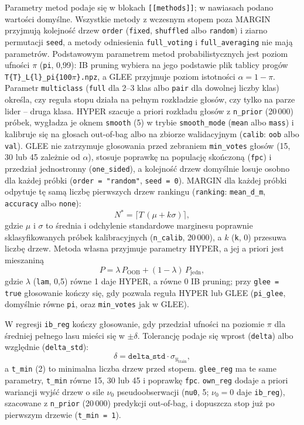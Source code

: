 \documentclass{article}
\newcommand{\code}[1]{\texttt{#1}}
\begin{document}
Parametry metod podaje się w blokach \code{[[methods]]}; w nawiasach podano wartości
domyślne. Wszystkie metody z wczesnym stopem poza MARGIN przyjmują kolejność drzew
\code{order} (\code{fixed}, \code{shuffled} albo \code{random}) i ziarno permutacji
\code{seed}, a metody odniesienia \code{full\_voting} i \code{full\_averaging} nie mają
parametrów. Podstawowym parametrem metod probabilistycznych jest poziom ufności $\pi$
(\code{pi}, 0,99): IB pruning wybiera na jego podstawie plik tablicy progów
\code{T\{T\}\_L\{l\}\_pi\{100$\pi$\}.npz}, a GLEE przyjmuje poziom istotności
$\alpha = 1 - \pi$. Parametr \code{multiclass} (\code{full} dla 2--3 klas albo \code{pair}
dla dowolnej liczby klas) określa, czy reguła stopu działa na pełnym rozkładzie głosów,
czy tylko na parze lider -- druga klasa. HYPER szacuje a priori rozkładu głosów z
\code{n\_prior} (20\,000) próbek, wygładza je oknem \code{smooth} (5) w trybie
\code{smooth\_mode} (\code{mean} albo \code{mass}) i kalibruje się na głosach out-of-bag
albo na zbiorze walidacyjnym (\code{calib}: \code{oob} albo \code{val}). GLEE nie
zatrzymuje głosowania przed zebraniem \code{min\_votes} głosów (15, 30 lub 45 zależnie od
$\alpha$), stosuje poprawkę na populację skończoną (\code{fpc}) i przedział jednostronny
(\code{one\_sided}), a kolejność drzew domyślnie losuje osobno dla każdej próbki
(\code{order = "random"}, \code{seed = 0}). MARGIN dla każdej próbki odpytuje tę samą
liczbę pierwszych drzew rankingu (\code{ranking}: \code{mean\_d\_m}, \code{accuracy} albo
\code{none}):
\[
  N^* = \bigl\lceil T\,(\mu + k\sigma) \bigr\rceil ,
\]
gdzie $\mu$ i $\sigma$ to średnia i odchylenie standardowe marginesu poprawnie
sklasyfikowanych próbek kalibracyjnych (\code{n\_calib}, 20\,000), a $k$ (\code{k}, 0)
przesuwa liczbę drzew. Metoda własna przyjmuje parametry HYPER, a jej a priori jest
mieszaniną
\[
  P = \lambda\, P_{\mathrm{OOB}} + (1 - \lambda)\, P_{\mathrm{jedn}} ,
\]
gdzie $\lambda$ (\code{lam}, 0,5) równe 1 daje HYPER, a równe 0 IB pruning; przy
\code{glee = true} głosowanie kończy się, gdy pozwala reguła HYPER lub GLEE
(\code{pi\_glee}, domyślnie równe \code{pi}, oraz \code{min\_votes} jak w GLEE).

W regresji \code{ib\_reg} kończy głosowanie, gdy przedział ufności na poziomie $\pi$ dla
średniej pełnego lasu mieści się w $\pm\delta$. Tolerancję podaje się wprost (\code{delta})
albo względnie (\code{delta\_std}):
\[
  \delta = \mathtt{delta\_std} \cdot \sigma_{y_{\mathrm{train}}} ,
\]
a \code{t\_min} (2) to minimalna liczba drzew przed stopem. \code{glee\_reg} ma te same
parametry, \code{t\_min} równe 15, 30 lub 45 i poprawkę \code{fpc}. \code{own\_reg}
dodaje a priori wariancji wyjść drzew o sile $\nu_0$ pseudoobserwacji (\code{nu0}, 5;
$\nu_0 = 0$ daje \code{ib\_reg}), szacowane z \code{n\_prior} (20\,000) predykcji
out-of-bag, i dopuszcza stop już po pierwszym drzewie (\code{t\_min = 1}).
\end{document}

